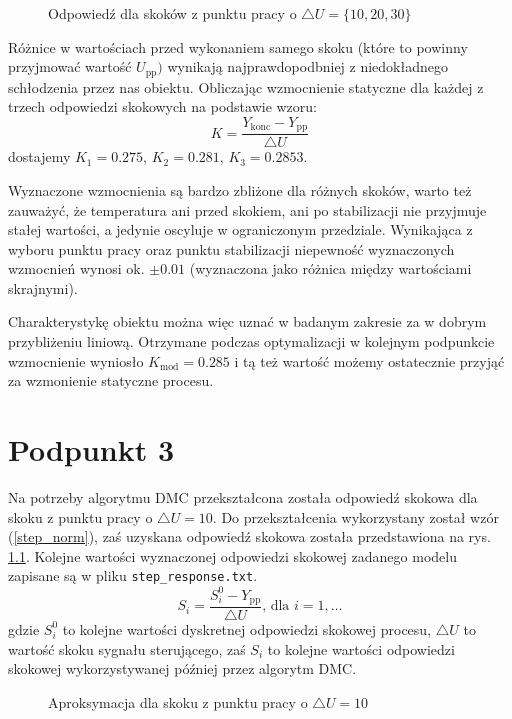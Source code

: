 \begin{figure}[ht]
\centering

\caption{Odpowiedź dla skoków z punktu pracy o $\triangle U = \{10, 20, 30\}$}
\label{R1}
\end{figure}
Różnice w wartościach przed wykonaniem samego skoku (które to powinny przyjmować wartość $U_{\mathrm{pp}})$ wynikają najprawdopodbniej z niedokładnego schłodzenia przez nas obiektu.
Obliczając wzmocnienie statyczne dla każdej z trzech odpowiedzi skokowych na podstawie wzoru:
\begin{equation}
 K=\frac{Y_{\mathrm{konc}}-Y_{\mathrm{pp}}}{\triangle U}
 \end{equation}
dostajemy $K_1=\num{0,275}$, $K_2=\num{0,281}$, $K_3=\num{0,2853}$.

Wyznaczone wzmocnienia są bardzo zbliżone dla różnych skoków, warto też zauważyć, że temperatura ani przed skokiem, ani po stabilizacji nie przyjmuje stałej wartości, a jedynie oscyluje w ograniczonym przedziale. Wynikająca z wyboru punktu pracy oraz punktu stabilizacji niepewność wyznaczonych wzmocnień wynosi ok. $\pm \num{0,01}$ (wyznaczona jako różnica między wartościami skrajnymi).

Charakterystykę obiektu można więc uznać w badanym zakresie za w dobrym przybliżeniu liniową. Otrzymane podczas optymalizacji w kolejnym podpunkcie wzmocnienie wyniosło $K_{\mathrm{mod}}=\num{0,285}$ i tą też wartość możemy ostatecznie przyjąć za wzmonienie statyczne procesu.


\chapter{Podpunkt 3}
Na potrzeby algorytmu DMC przekształcona została odpowiedź skokowa dla skoku z punktu pracy o $\triangle U = 10$. Do przekształcenia wykorzystany został wzór (\ref{step_norm}), zaś uzyskana odpowiedź skokowa została przedstawiona na rys. \ref{R2}. Kolejne wartości wyznaczonej odpowiedzi skokowej zadanego modelu zapisane są w pliku \verb+step_response.txt+.
\begin{equation}
S_i = \frac{S_i^0 - Y_{\mathrm{pp}}}{\triangle U} \textrm{, dla } i=1,\ldots
\label{step_norm}
\end{equation}
gdzie $S_i^0$ to kolejne wartości dyskretnej odpowiedzi skokowej procesu, $\triangle U$ to wartość skoku sygnału sterującego, zaś $S_i$ to kolejne wartości odpowiedzi skokowej wykorzystywanej później przez algorytm DMC.

\begin{figure}[ht]
\centering

\caption{Aproksymacja dla skoku z punktu pracy o $\triangle U = 10$}
\label{R2}
\end{figure}

